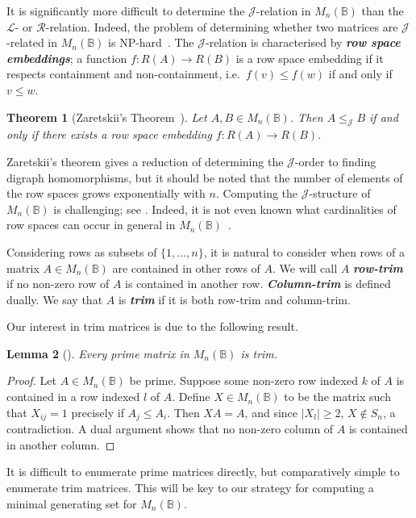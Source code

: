 \documentclass[11pt]{article}
\newtheorem{thm}{Theorem}[section]
\newtheorem{lemma}[thm]{Lemma}
\newcommand{\defn}[1]{\textbf{\textit{#1}}}
\numberwithin{equation}{section}
\renewcommand{\to}{\longrightarrow}
\newcommand{\B}{\mathbb{B}}
\newcommand{\Bn}{M_n(\B)}
\renewcommand{\L}{\mathscr{L}}
\newcommand{\R}{\mathscr{R}}
\newcommand{\J}{\mathscr{J}}
\begin{document}
It is significantly more difficult to determine the $\J$-relation in $\Bn$ than
the $\L$- or $\R$-relation. Indeed, the problem of determining whether two
matrices are $\J$-related in $\Bn$ is NP-hard~\cite[Theorem 2.7]{Fenner2018aa}.
The $\J$-relation is characterised by \defn{row space embeddings}; a function
$f: R(A) \to R(B)$ is a row space embedding if it respects containment and
non-containment, i.e.\ $f(v) \leq f(w)$ if and only if $v \leq w$.
\begin{thm}[Zaretskii's Theorem~\cite{Zaretskii1963aa}]
  Let $A, B \in \Bn$. Then $A \leq_{\J} B$ if and only if there exists a row
  space embedding $f: R(A) \to R(B)$.
\end{thm}
Zaretskii's theorem gives a reduction of determining the $\J$-order to finding
digraph homomorphisms, but it should be noted that the number of elements of the
row spaces grows exponentially with $n$. Computing the $\J$-structure of $\Bn$
is challenging; see \cite{Breen1997aa}. Indeed, it is not even known what
cardinalities of row spaces can occur in general in
$\Bn$~\cite{rowspacecardinalities}. 

Considering rows as subsets of $\{1, \ldots, n\}$, it is natural to consider
when rows of a matrix $A \in \Bn$ are contained in other rows of $A$. We will
call $A$ \defn{row-trim} if no non-zero row of $A$ is contained in another row.
\defn{Column-trim} is defined dually. We say that $A$ is \defn{trim} if it is
both row-trim and column-trim.

Our interest in trim matrices is due to the following result.

\begin{lemma}[{\cite[Lemma 3.1]{Konieczny2011aa}}]
  Every prime matrix in $\Bn$ is trim.
\end{lemma}
\begin{proof}
  Let $A \in \Bn$ be prime. Suppose some non-zero row indexed $k$ of $A$ is
  contained in a row indexed $l$ of $A$. Define $X \in \Bn$ to be the matrix
  such that $X_{ij} = 1$ precisely if $A_j \leq A_i$. Then $XA = A$, and since
  $|X_l| \geq 2$, $X \not\in S_n$, a contradiction. A dual argument shows that
  no non-zero column of $A$ is contained in another column.
\end{proof}

It is difficult to enumerate prime matrices directly, but comparatively simple
to enumerate trim matrices. This will be key to our strategy for computing a
minimal generating set for $\Bn$.
\end{document}
